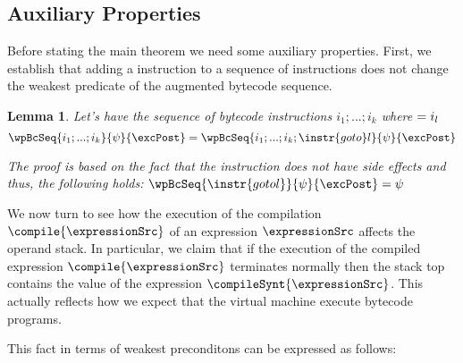 

\newtheorem{interProp}{Lemma} %

\newtheorem{exprValueOnStack}[interProp]{Lemma}
\newtheorem{stackCounter}[interProp]{Lemma}
\newtheorem{dupProp}[interProp]{Lemma}
\newtheorem{newProp}[interProp]{Lemma}


\subsection{Auxiliary Properties}

Before stating the main theorem we need some auxiliary properties.
 First, we establish that adding a  instruction  to a sequence of instructions does not change the weakest predicate of the
 augmented bytecode sequence.  


\begin{interProp} \label{interProp}
Let's have the sequence of bytecode instructions $i_1;...;i_k$ where $ \next{i_k} = i_l$
     $$ \wpBcSeq{ i_1;...;i_k}{ \psi  }  { \excPost } = 
\wpBcSeq{i_1;...;i_k; \instr{goto} l }{\psi }{\excPost} $$

The proof is based on the fact that the instruction  does not have side effects and thus,
the following holds: $ \wpBcSeq{ \instr{goto l}}{\psi}{\excPost} = \psi $
\end{interProp}


We now turn to see how the execution of the compilation  $\compile{\expressionSrc}$ of an expression 
$\expressionSrc$ affects the operand stack. In particular, we claim that if the execution of the compiled expression 
 $\compile{\expressionSrc}$ terminates normally then the stack top contains the value of the expression $\compileSynt{\expressionSrc}$.
This actually reflects how we expect that the virtual machine execute bytecode programs.

 This fact in terms of weakest 
preconditons can be expressed as follows: 

